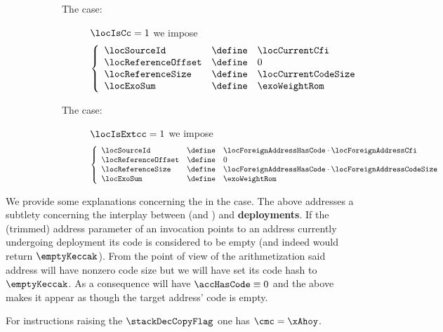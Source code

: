 \begin{description}
\begin{description}
\begin{description}
\[						\]
					\item[The \inst{CODECOPY} case:]
						\If $\locIsCc = 1$ \Then
						we impose
						\[
							\left\{ \begin{array}{lcl}
								\locSourceId        & \define & \locCurrentCfi      \\
								\locReferenceOffset & \define & 0                   \\
								\locReferenceSize   & \define & \locCurrentCodeSize \\
								\locExoSum          & \define & \exoWeightRom       \\
							\end{array} \right.
						\]
					\item[The \inst{EXTCODECOPY} case:]
						\If $\locIsExtcc = 1$ \Then
						we impose
						\[
							\left\{ \begin{array}{lcl}
								\locSourceId        & \define & \locForeignAddressHasCode \cdot \locForeignAddressCfi      \\
								\locReferenceOffset & \define & 0                                                          \\
								\locReferenceSize   & \define & \locForeignAddressHasCode \cdot \locForeignAddressCodeSize \\
								\locExoSum          & \define & \exoWeightRom                                              \\
							\end{array} \right.
						\]
				\end{description}
			\end{description}
		\end{description}
		\saNote{}
		\label{hub: instruction handling: copy: extcodecopy: subtlety around existence and liveness of foreign account}
		We provide some explanations concerning the \locReferenceSize{} in the  case.
		The above addresses a subtlety concerning the interplay between  (and ) and \textbf{deployments}.
		If the (trimmed) address parameter of an  invocation points to an address currently undergoing deployment its code is considered to be empty (and indeed  would return $\emptyKeccak$).
		From the point of view of the arithmetization said address will have nonzero code size but we will have set its code hash to $\emptyKeccak$.
		As a consequence will have $\accHasCode \equiv 0$ and the above makes it appear as though the target address' code is empty.

		\saNote{} For instructions raising the $\stackDecCopyFlag$ one has $\cmc = \xAhoy$.
